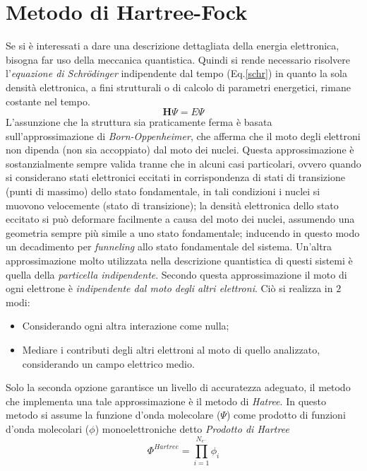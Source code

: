 \documentclass[oneside]{amsbook}
\numberwithin{section}{chapter}
\numberwithin{equation}{section}
\numberwithin{figure}{section}
\begin{document}
\chapter{Metodo di Hartree-Fock}
Se si è interessati a dare una descrizione dettagliata della energia elettronica, bisogna far uso della meccanica quantistica. Quindi si rende necessario risolvere l'\emph{equazione di Schr\"{o}dinger } indipendente dal tempo (Eq.\ref{schr}) in quanto la sola densità elettronica, a fini strutturali o di calcolo di parametri energetici, rimane costante nel tempo.
\begin{equation}
\label{schr}
 \textbf{H}\Psi = E \Psi
\end{equation}
L'assunzione che la struttura sia praticamente ferma è basata sull'approssimazione di \emph{Born-Oppenheimer}, che afferma che il moto degli elettroni non dipenda (non sia accoppiato) dal moto dei nuclei. Questa approssimazione è sostanzialmente sempre valida tranne che in alcuni casi particolari, ovvero quando si considerano stati elettronici eccitati in corrispondenza di stati di transizione (punti di massimo) dello stato fondamentale, in tali condizioni i nuclei si muovono velocemente (stato di transizione); la densità elettronica dello stato eccitato si può deformare facilmente a causa del moto dei nuclei, assumendo una geometria sempre più simile a uno stato fondamentale;  inducendo in questo modo un decadimento  per \emph{funneling} allo stato fondamentale del sistema.
Un'altra approssimazione molto utilizzata nella descrizione quantistica di questi sistemi è quella della \emph{particella indipendente}. Secondo questa approssimazione il moto di ogni elettrone è \emph{indipendente dal moto degli altri elettroni}. Ciò si realizza in $2$ modi:
\begin{itemize}
\item Considerando ogni altra interazione come nulla;
\item Mediare i contributi degli altri elettroni al moto di quello analizzato, considerando un campo elettrico medio.
\end{itemize}
Solo la seconda opzione garantisce un livello di accuratezza adeguato, il metodo che implementa una tale approssimazione è il metodo di \emph{Hatree}. In questo metodo si assume la funzione d'onda molecolare ($\Psi$) come prodotto di funzioni d'onda molecolari ($\phi$) monoelettroniche detto \emph{Prodotto di Hartree}
\begin{equation}
\Phi^{Hartree}=\prod \limits _{i=1} ^{N_{e^-}} \phi _i
\end{equation}
\end{document}
